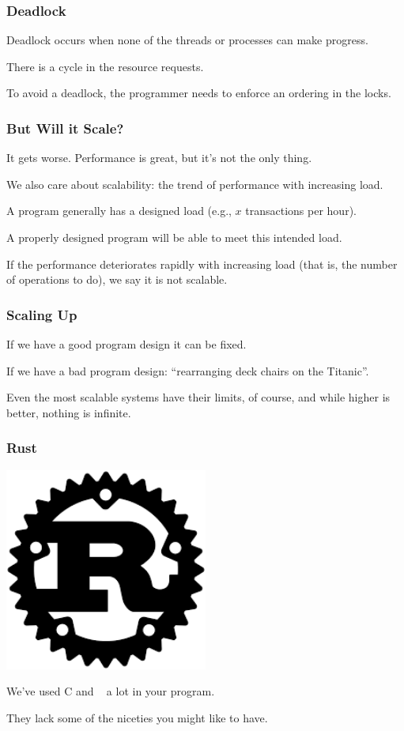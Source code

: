\begin{frame}
\frametitle{Deadlock}

 \alert{Deadlock}
occurs when none of the threads or processes can make progress.

There is a cycle in the resource requests. 

To avoid a deadlock, the programmer needs to enforce an ordering in the locks.


\end{frame}



\begin{frame}
\frametitle{But Will it Scale?}

It gets worse. Performance is great, but it's not the only thing. 

We also care about \alert{scalability}: the trend of performance with increasing load. 

A program generally has a designed load (e.g., $x$ transactions per hour). 

A properly designed program will be able to meet this intended load. 

If the performance deteriorates rapidly with increasing load (that is, the number of operations to do), we say it is \alert{not scalable}.

\end{frame}



\begin{frame}
\frametitle{Scaling Up}

If we have a good program design it can be fixed. 

If we have a bad program design: ``rearranging deck chairs on the Titanic''.

Even the most scalable systems have their limits, of course, and while higher is better, nothing is infinite.

\end{frame}

\begin{frame}
\frametitle{Rust}

\begin{center}
	\includegraphics[width=0.5\textwidth]{images/Rust.png}
\end{center}

We've used C and \CPP~ a lot in your program.

They lack some of the niceties you might like to have.

\end{frame}


